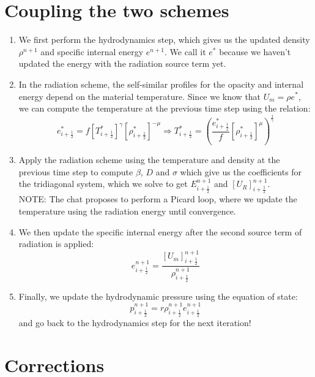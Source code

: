\documentclass[11pt]{article}
\begin{document}
\section{Coupling the two schemes}
\begin{enumerate}
  \item We first perform the hydrodynamics step, which gives us the updated density $\rho^{n+1}$ and specific internal energy $e^{n+1}$. We call it $e^*$ because we haven't updated the energy with the radiation source term yet.
  \item In the radiation scheme, the self-similar profiles for the opacity and internal energy depend on the material temperature. Since we know that $U_m = \rho e^*$, we can compute the temperature at the previous time step using the relation:
  \begin{equation}
    e_{i+\frac{1}{2}}^* = f \left[T_{i+\frac{1}{2}}^*\right]^{\gamma} \left[\rho_{i+\frac{1}{2}}^{*}\right]^{-\mu} \Rightarrow T_{i+\frac{1}{2}}^* = \left(\frac{e_{i+\frac{1}{2}}^*}{f} \left[\rho_{i+\frac{1}{2}}^{*}\right]^{\mu}\right)^{\frac{1}{\gamma}}
  \end{equation}
  \item Apply the radiation scheme using the temperature and density at the previous time step to compute $\beta$, $D$ and $\sigma$ which give us the coefficients for the tridiagonal system, which we solve to get $E_{i+\frac{1}{2}}^{n+1}$ and $\left[U_R\right]_{i+\frac{1}{2}}^{n+1}$. \\
  NOTE: The chat proposes to perform a Picard loop, where we update the temperature using the radiation energy until convergence.
  \item We then update the specific internal energy after the second source term of radiation is applied:
  \begin{equation}
    e_{i+\frac{1}{2}}^{n+1} = \frac{[U_m]_{i+\frac{1}{2}}^{n+1}}{\rho_{i+\frac{1}{2}}^{n+1}}
  \end{equation}
  \item Finally, we update the hydrodynamic pressure using the equation of state:
  \begin{equation}
    p_{i+\frac{1}{2}}^{n+1} = r \rho_{i+\frac{1}{2}}^{n+1} e_{i+\frac{1}{2}}^{n+1}
  \end{equation}
  and go back to the hydrodynamics step for the next iteration!
\end{enumerate}
\section{Corrections}
\end{document}
